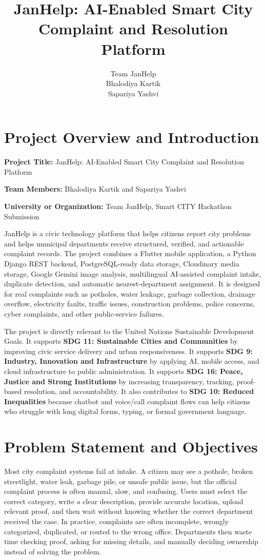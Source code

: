\documentclass[11pt,a4paper]{article}
\title{\textbf{JanHelp: AI-Enabled Smart City Complaint and Resolution Platform}}
\author{Team JanHelp \\ Bhalodiya Kartik \\ Sapariya Yashvi}
\date{}
\begin{document}
\maketitle

\section*{Project Overview and Introduction}
\textbf{Project Title:} JanHelp: AI-Enabled Smart City Complaint and Resolution Platform

\textbf{Team Members:} Bhalodiya Kartik and Sapariya Yashvi

\textbf{University or Organization:} Team JanHelp, Smart CITY Hackathon Submission

JanHelp is a civic technology platform that helps citizens report city problems and helps municipal departments receive structured, verified, and actionable complaint records. The project combines a Flutter mobile application, a Python Django REST backend, PostgreSQL-ready data storage, Cloudinary media storage, Google Gemini image analysis, multilingual AI-assisted complaint intake, duplicate detection, and automatic nearest-department assignment. It is designed for real complaints such as potholes, water leakage, garbage collection, drainage overflow, electricity faults, traffic issues, construction problems, police concerns, cyber complaints, and other public-service failures.

The project is directly relevant to the United Nations Sustainable Development Goals. It supports \textbf{SDG 11: Sustainable Cities and Communities} by improving civic service delivery and urban responsiveness. It supports \textbf{SDG 9: Industry, Innovation and Infrastructure} by applying AI, mobile access, and cloud infrastructure to public administration. It supports \textbf{SDG 16: Peace, Justice and Strong Institutions} by increasing transparency, tracking, proof-based resolution, and accountability. It also contributes to \textbf{SDG 10: Reduced Inequalities} because chatbot and voice/call complaint flows can help citizens who struggle with long digital forms, typing, or formal government language.

\section*{Problem Statement and Objectives}
Most city complaint systems fail at intake. A citizen may see a pothole, broken streetlight, water leak, garbage pile, or unsafe public issue, but the official complaint process is often manual, slow, and confusing. Users must select the correct category, write a clear description, provide accurate location, upload relevant proof, and then wait without knowing whether the correct department received the case. In practice, complaints are often incomplete, wrongly categorized, duplicated, or routed to the wrong office. Departments then waste time checking proof, asking for missing details, and manually deciding ownership instead of solving the problem.
\end{document}
